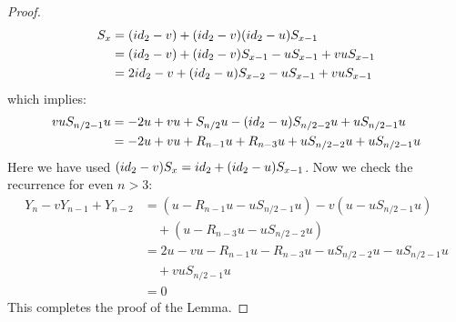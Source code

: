 \documentclass[11pt]{article}
\theoremstyle{definition}
\numberwithin{equation}{section}
\newcommand{\id}{{\rm id}}
\begin{document}
\begin{proof}
\begin{align*}S_x  &= (\id_2-v)  + (\id_2-v)(\id_2-u) S_{x-1}\\
  &= (\id_2-v)  + (\id_2-v)S_{x-1}  - u S_{x-1} + v u S_{x-1}  
\\
 &= 2\id_2 -v  + (\id_2-u)S_{x-2}  - u S_{x-1} + v u S_{x-1}  
\end{align*} which implies:
\begin{align*} v u S_{n/2-1} u &= - 2u + v u +S_{n/2} u- (\id_2-u) S_{n/2-2} u +u S_{n/2-1}u\\
&= 
-2 u + v u + R_{n-1} u+ R_{n-3}u + u S_{n/2-2} u +u S_{n/2-1}u
\end{align*}
Here we have used $(\id_2-v)S_x = \id_2 + (\id_2-u)S_{x-1}$. Now we check the recurrence for even $n>3$:
\begin{align*}
  Y_n-v Y_{n-1}+Y_{n-2} &= (u - R_{n-1}u - u S_{n/2-1} u) - v (u - u S_{n/2-1} u) \\
  &\quad + (u - R_{n-3}u - u S_{n/2-2} u) \\
  &= 2u -v u - R_{n-1}u -R_{n-3}u - u S_{n/2-2} u- u S_{n/2-1} u  \\
  &\quad + v u S_{n/2-1} u \\
  &= 0 
\end{align*}
This completes the proof of the Lemma.
\end{proof}
\end{document}
